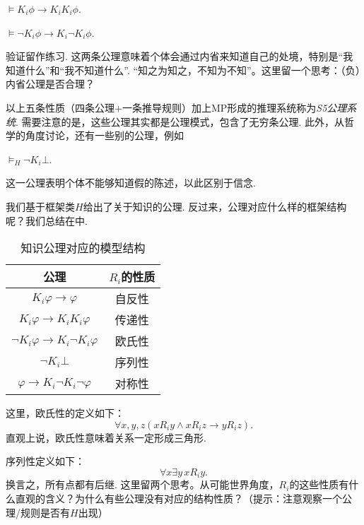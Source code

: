 \begin{axiom}[正内省公理]
    $\vDash K_i\phi\to K_iK_i\phi$.
\end{axiom}

\begin{axiom}[负内省公理]
    $\vDash \neg K_i\phi\to K_i\neg K_i\phi$.
\end{axiom}

验证留作练习.  这两条公理意味着个体会通过内省来知道自己的处境，特别是“我知道什么”和“我不知道什么”. “知之为知之，不知为不知”。这里留一个思考：（负）内省公理是否合理？

以上五条性质（四条公理+一条推导规则）加上MP形成的推理系统称为\emph{S5公理系统}. 需要注意的是，这些公理其实都是公理模式，包含了无穷条公理. 此外，从哲学的角度讨论，还有一些别的公理，例如
\begin{axiom}[一致性公理]
    $\vDash_H\neg K_i\bot$.
\end{axiom}
这一公理表明个体不能够知道假的陈述，以此区别于信念.

我们基于框架类$H$给出了关于知识的公理. 反过来，公理对应什么样的框架结构呢？我们总结在中.
    \begin{table}[ht]
        \centering
       \begin{tabular}{cc}
\toprule 公理 &  $R_i$的性质 \\
\midrule $K_i \varphi \to \varphi$ & 自反性 \\
$K_i \varphi \to K_i K_i \varphi$ & 传递性 \\
$\neg K_i \varphi \to K_i \neg K_i \varphi$ & 欧氏性 \\
$\neg K_i\bot$  & 序列性\\
$\varphi \to K_i \neg K_i \neg \varphi$ & 对称性 \\
\bottomrule
\end{tabular}
        \caption{知识公理对应的模型结构}
        \label{tab:knowledge-axiom-frame}
    \end{table}

这里，欧氏性的定义如下：
\[\forall x,y,z(xR_iy\wedge xR_iz\to yR_iz).\]
直观上说，欧氏性意味着关系一定形成三角形.

序列性定义如下：
\[\forall x\exists y\, xR_iy.\]
换言之，所有点都有后继. 这里留两个思考。从可能世界角度，$R_i$的这些性质有什么直观的含义？为什么有些公理没有对应的结构性质？（提示：注意观察一个公理/规则是否有$H$出现）

